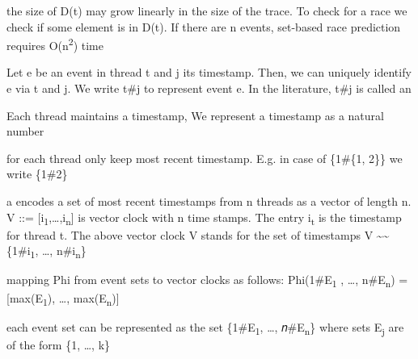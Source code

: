 \documentclass[landscape, a4paper]{article}
\begin{document}
\begin{minipage}[t]{0.19\linewidth}
  \begin{betterlist}
		\item the size of D(t) may grow linearly in the size of the trace. To check for a race we check if some element is in D(t). If there are n events, set-based race prediction requires O(n\textsuperscript{2}) time
  \end{betterlist}
	\begin{betterlist}
		\item Let e be an event in thread t and j its timestamp. Then, we can uniquely identify e via t and j. We write t\#j to represent event e. In the literature, t\#j is called an 
		\begin{betterlist}
			\item {} Each thread maintains a timestamp, We represent a timestamp as a natural number%
			\item for each thread only keep most recent timestamp. E.g. in case of \{1\#\{1, 2\}\} we write \{1\#2\}
		\end{betterlist}
		\item a  encodes a set of most recent timestamps from n threads as a vector of length n. V ::= [i\textsubscript{1},\ldots ,i\textsubscript{n}] is vector clock with n time stamps. The entry i\textsubscript{t} is the timestamp for thread t. The above vector clock V stands for the set of timestamps V  \sim\sim  \{1\#i\textsubscript{1}, \ldots, n\#i\textsubscript{n}\} %
		\begin{betterlist}
			\item mapping Phi from event sets to vector clocks as follows: Phi({1\#E\textsubscript{1} , \ldots, n\#E\textsubscript{n}}) = [max(E\textsubscript{1}), \ldots, max(E\textsubscript{n})]
			\begin{betterlist}
				\item each event set can be represented as the set \{1\#E\textsubscript{1}, \ldots, 𝑛\#E\textsubscript{n}\} where sets E\textsubscript{j} are of the form \{1, \ldots, k\}

\end{betterlist}
\end{betterlist}
\end{betterlist}
\end{minipage}
\end{document}
